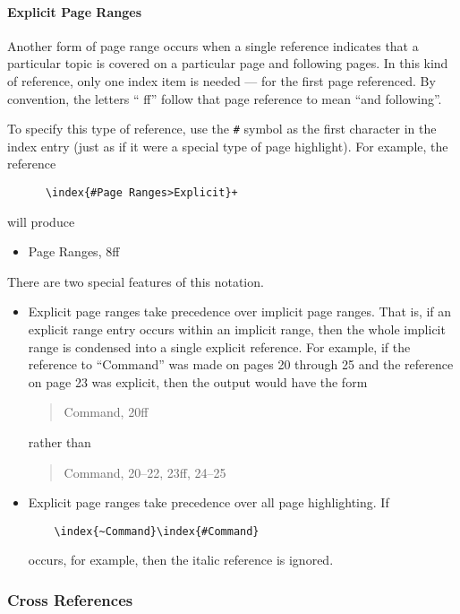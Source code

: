 \paragraph{Explicit Page Ranges}

Another form of page range occurs when a single
reference indicates that a particular topic is covered on a particular page
and following pages.  In this kind of reference, only one index item is
needed --- for the first page referenced.  By convention, the letters ``{\sf
ff}''
follow that page reference to mean ``and following''.

To specify this type of reference, use the {\tt \#}
symbol as the first
character in the index entry (just as if it were a special type of page 
highlight).  For example, the reference 
\begin{verbatim}
      \index{#Page Ranges>Explicit}+
\end{verbatim}
will produce 
\begin{itemize}
\item{Page Ranges, \mbox{\rm 8\sf ff}}
\end{itemize}

There are two special features of this notation.
\begin{itemize}
\item Explicit page ranges take precedence over implicit page ranges.  That is,
if an explicit range entry occurs within an implicit range, then the whole
implicit range is condensed into a single explicit reference.  For example,
if the reference to ``Command'' was made on pages 20 through 25 and the 
reference on page 23 was explicit, then the output would have the form
\begin{quote}
\qquad Command, 20{\sf ff}
\end{quote}
rather than
\begin{quote}
\qquad Command, 20--22, 23{\sf ff}, 24--25
\end{quote}
\item Explicit page ranges take precedence over all page highlighting.  If
\begin{verbatim}
    \index{~Command}\index{#Command}
\end{verbatim}
occurs, for example, then the italic reference is ignored.
\end{itemize}

\subsubsection{Cross References}


